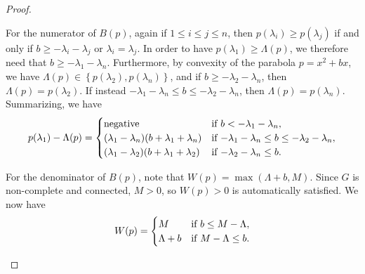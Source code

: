 \documentclass[10pt,a4paper]{amsart}
\theoremstyle{definition}
\begin{document}
\begin{proof}
\begin{itemize}
    For the numerator of $B(p)$, again if $1\le i \le j \le n$, then $p(\lambda_i)\ge p(\lambda_j)$ if and only if $b\ge -\lambda_i-\lambda_j$ or $\lambda_i=\lambda_j$. In order to have $p(\lambda_1)\ge \Lambda(p)$, we therefore need that $b\ge -\lambda_1-\lambda_n$. Furthermore, by convexity of the parabola $p=x^2+bx$, we have $\Lambda(p)\in \left\{p(\lambda_2),p(\lambda_n)\right\}$, and if $b\ge -\lambda_2-\lambda_n$, then $\Lambda(p)=p(\lambda_2)$. If instead $-\lambda_1-\lambda_n \le b \le -\lambda_2-\lambda_n$, then $\Lambda(p)=p(\lambda_n)$. Summarizing, we have 
    \[p(\lambda_1)-\Lambda(p)=\begin{cases}
        $negative$ &$if $b<-\lambda_1-\lambda_n,\\
        (\lambda_1-\lambda_n)(b+\lambda_1+\lambda_n) &$if $-\lambda_1-\lambda_n \le b \le -\lambda_2 - \lambda_n,\\
        (\lambda_1-\lambda_2)(b+\lambda_1+\lambda_2) &$if $-\lambda_2-\lambda_n \le b.
    \end{cases}\]

    For the denominator of $B(p)$, note that $W(p)=\max(\Lambda+b,M)$. Since $G$ is non-complete and connected, $M>0$, so $W(p)>0$ is automatically satisfied. We now have
    \[W(p)=\begin{cases}
        M &$if $b\le M-\Lambda,\\
        \Lambda+b &$if $M-\Lambda\le b.
    \end{cases}\]


\end{itemize}
\end{proof}
\end{document}

